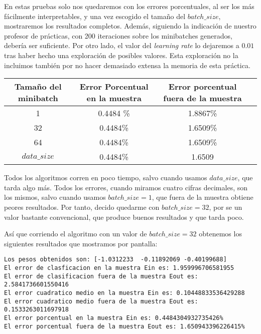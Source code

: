 \documentclass[11pt]{article}
\begin{document}
En estas pruebas solo nos quedaremos con los errores porcentuales, al ser los más fácilmente interpretables, y una vez escogido el tamaño del $batch\_size$, mostraremos los resultados completos. Además, siguiendo la indicación de nuestro profesor de prácticas, con 200 iteraciones sobre los minibatches generados, debería ser suficiente. Por otro lado, el valor del \emph{learning rate} lo dejaremos a $0.01$ tras haber hecho una exploración de posibles valores. Esta exploración no la incluimos también por no hacer demasiado extensa la memoria de esta práctica.

\begin{center}
    \begin{tabular}{| c | c | c | c |}
        Tamaño del minibatch & Error Porcentual en la muestra & Error porcentual fuera de la muestra \\
        \hline
        1 & 0.4484 \% & 1.8867\% \\
        32 & 0.4484\% & 1.6509\% \\
        64 & 0.4484\% & 1.6509\% \\
        $data\_size$ & 0.4484\% & 1.6509 \\
        \hline
    \end{tabular}
\end{center}

Todos los algoritmos corren en poco tiempo, salvo cuando usamos $data\_size$, que tarda algo más. Todos los errores, cuando miramos cuatro cifras decimales, son los mismos, salvo cuando usamos $batch\_size = 1$, que fuera de la muestra obtiene peores resultados. Por tanto, decido quedarme con $batch\_size = 32$, por se un valor bastante convencional, que produce buenos resultados y que tarda poco.

Así que corriendo el algoritmo con un valor de $batch\_size = 32$ obtenemos los siguientes resultados que mostramos por pantalla:

\begin{lstlisting}
Los pesos obtenidos son: [-1.0312233  -0.11892069 -0.40199688]
El error de clasficacion en la muestra Ein es: 1.959996706581955
El error de clasificacion fuera de la muestra Eout es: 2.5841736601550416
El error cuadratico medio en la muestra Ein es: 0.10448833536429288
El error cuadratico medio fuera de la muestra Eout es: 0.1533263011697918
El error porcentual en la muestra Ein es: 0.4484304932735426%
El error porcentual fuera de la muestra Eout es: 1.650943396226415%
\end{lstlisting}
\end{document}
